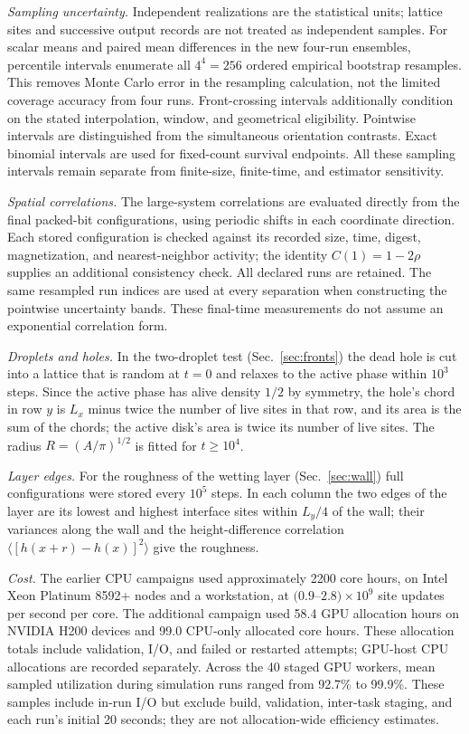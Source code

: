 \documentclass[pre,twocolumn,superscriptaddress,showpacs,floatfix]{revtex4-2}
\begin{document}
\textit{Sampling uncertainty.} Independent realizations are the statistical
units; lattice sites and successive output records are not treated as
independent samples. For scalar means and paired mean differences in the new
four-run ensembles, percentile intervals enumerate all $4^4=256$ ordered
empirical bootstrap resamples. This removes Monte Carlo error in the
resampling calculation, not the limited coverage accuracy from four runs.
Front-crossing intervals additionally condition on the stated interpolation,
window, and geometrical eligibility. Pointwise intervals are distinguished
from the simultaneous orientation contrasts. Exact binomial intervals are
used for fixed-count survival endpoints. All these sampling intervals remain
separate from finite-size, finite-time, and estimator sensitivity.

\textit{Spatial correlations.} The large-system correlations are evaluated
directly from the final packed-bit configurations, using periodic shifts in
each coordinate direction. Each stored configuration is checked against its
recorded size, time, digest, magnetization, and nearest-neighbor activity;
the identity $C(1)=1-2\rho$ supplies an additional consistency check.
All declared runs are retained. The same resampled run indices are used at
every separation when constructing the pointwise uncertainty bands.
These final-time measurements do not assume an exponential correlation form.

\textit{Droplets and holes.} In the two-droplet test (Sec.~\ref{sec:fronts}) the dead hole is cut
into a lattice that is random at $t = 0$ and relaxes to the active phase within $10^3$ steps. Since
the active phase has alive density $1/2$ by symmetry, the hole's chord in row $y$ is $L_x$ minus
twice the number of live sites in that row, and its area is the sum of the chords; the active
disk's area is twice its number of live sites. The radius $R = (A/\pi)^{1/2}$ is fitted for
$t\ge 10^4$.

\textit{Layer edges.} For the roughness of the wetting layer (Sec.~\ref{sec:wall}) full
configurations were stored every $10^5$ steps. In each column the two edges of the layer are its
lowest and highest interface sites within $L_y/4$ of the wall; their variances along the wall and
the height-difference correlation $\langle[h(x+r)-h(x)]^2\rangle$ give the roughness.

\textit{Cost.} The earlier CPU campaigns used approximately 2200 core hours,
on Intel Xeon Platinum 8592+ nodes and a workstation, at
$(0.9$--$2.8)\times10^9$ site updates per second per core. The additional
campaign used 58.4 GPU allocation hours on NVIDIA H200 devices and
99.0 CPU-only allocated core hours. These allocation totals include validation,
I/O, and failed or restarted attempts; GPU-host CPU allocations are recorded
separately. Across the 40 staged GPU workers, mean sampled utilization during
simulation runs ranged from 92.7\% to 99.9\%. These samples include in-run
I/O but exclude build, validation, inter-task staging, and each run's initial
20 seconds; they are not allocation-wide efficiency estimates.


\end{document}
